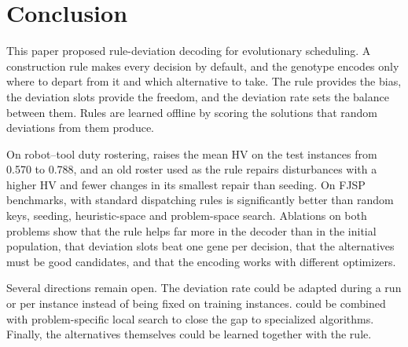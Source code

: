 \section{Conclusion}
\label{sec:conclusion}

This paper proposed rule-deviation decoding for evolutionary scheduling.
A construction rule makes every decision by default, and the genotype encodes only where to depart from it and which alternative to take.
The rule provides the bias, the deviation slots provide the freedom, and the deviation rate sets the balance between them.
Rules are learned offline by scoring the solutions that random deviations from them produce.

On robot--tool duty rostering, \RDD raises the mean HV on the test instances from 0.570 to 0.788, and an old roster used as the rule repairs disturbances with a higher HV and fewer changes in its smallest repair than seeding.
On FJSP benchmarks, \RDD with standard dispatching rules is significantly better than random keys, seeding, heuristic-space and problem-space search.
Ablations on both problems show that the rule helps far more in the decoder than in the initial population,
that deviation slots beat one gene per decision, that the alternatives must be good candidates, and that the encoding works with different optimizers.

Several directions remain open.
The deviation rate could be adapted during a run or per instance instead of being fixed on training instances.
\RDD could be combined with problem-specific local search to close the gap to specialized algorithms.
Finally, the alternatives themselves could be learned together with the rule.
